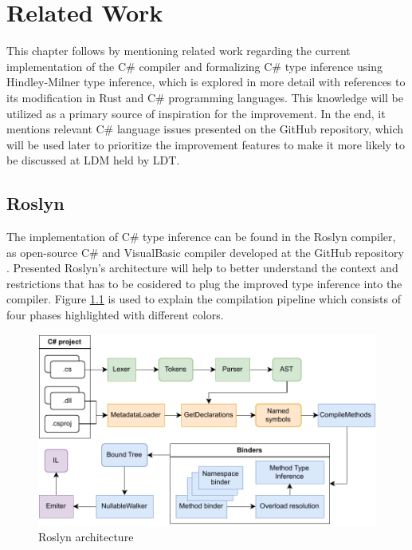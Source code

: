 \chapter{Related Work}

This chapter follows by mentioning related work regarding the current implementation of the C\# compiler and formalizing C\# type inference using Hindley-Milner type inference, which is explored in more detail with references to its modification in Rust and C\# programming languages.
This knowledge will be utilized as a primary source of inspiration for the improvement.
In the end, it mentions relevant C\# language issues presented on the GitHub repository, which will be used later to prioritize the improvement features to make it more likely to be discussed at \ac{LDM} held by \ac{LDT}. 

\section{Roslyn} \label{sect04:roslyn}

The implementation of C\# type inference can be found in the Roslyn compiler, as open-source C\# and VisualBasic compiler developed at the GitHub repository \cite{online:roslynRepo}. 
Presented Roslyn’s architecture will help to better understand the context and restrictions that has to be cosidered to plug the improved type inference into the compiler.
Figure \ref{img15:roslynPip} is used to explain the compilation pipeline \cite{online:roslynArchitecture} which consists of four phases highlighted with different colors.
\begin{figure}[h]
\centering
\includegraphics[width=140mm]{./img/Roslyn.pdf}
\caption{Roslyn architecture}
\label{img15:roslynPip}
\end{figure}

